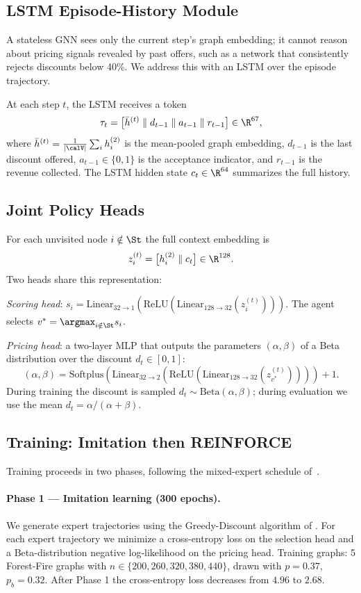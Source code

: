 \subsection{LSTM Episode-History Module}
\label{sec:lstm}

A stateless GNN sees only the current step's graph embedding; it cannot reason
about pricing signals revealed by past offers, such as a network that
consistently rejects discounts below 40\%.
We address this with an LSTM over the episode trajectory.

At each step $t$, the LSTM receives a token
\[
  \tau_t = \bigl[\bar{h}^{(t)}\;\|\; d_{t-1}\;\|\; a_{t-1}\;\|\; r_{t-1}\bigr]
  \in \R^{67},
\]
where $\bar{h}^{(t)} = \frac{1}{|\calV|}\sum_i h_i^{(2)}$ is the mean-pooled
graph embedding, $d_{t-1}$ is the last discount offered, $a_{t-1} \in \{0,1\}$
is the acceptance indicator, and $r_{t-1}$ is the revenue collected.
The LSTM hidden state $c_t \in \R^{64}$ summarizes the full history.

\subsection{Joint Policy Heads}
\label{sec:heads}

For each unvisited node $i \notin \St$ the full context embedding is
\[
  z_i^{(t)} = \bigl[h_i^{(2)}\;\|\; c_t\bigr] \in \R^{128}.
\]
Two heads share this representation:

\emph{Scoring head}: $s_i = \mathrm{Linear}_{32\to1}(\mathrm{ReLU}(\mathrm{Linear}_{128\to32}(z_i^{(t)})))$.
The agent selects $v^* = \argmax_{i \notin \St} s_i$.

\emph{Pricing head}: a two-layer MLP that outputs the parameters
$(\alpha, \beta)$ of a Beta distribution over the discount $d_t \in [0,1]$:
\[
  (\alpha, \beta) = \mathrm{Softplus}\!\left(\mathrm{Linear}_{32\to2}(\mathrm{ReLU}(\mathrm{Linear}_{128\to32}(z_{v^*}^{(t)})))\right) + 1.
\]
During training the discount is sampled $d_t \sim \mathrm{Beta}(\alpha,\beta)$;
during evaluation we use the mean $d_t = \alpha/(\alpha+\beta)$.

\subsection{Training: Imitation then REINFORCE}
\label{sec:training}

Training proceeds in two phases, following the mixed-expert
schedule of~\citet{anon_wsdm27}.

\paragraph{Phase 1 — Imitation learning (300 epochs).}
We generate expert trajectories using the Greedy-Discount algorithm of
\citet{babaei2013revenue}.
For each expert trajectory we minimize a cross-entropy loss on the selection
head and a Beta-distribution negative log-likelihood on the pricing head.
Training graphs: 5 Forest-Fire graphs with $n \in \{200, 260, 320, 380, 440\}$,
drawn with $p=0.37$, $p_b=0.32$.
After Phase 1 the cross-entropy loss decreases from $4.96$ to $2.68$.

